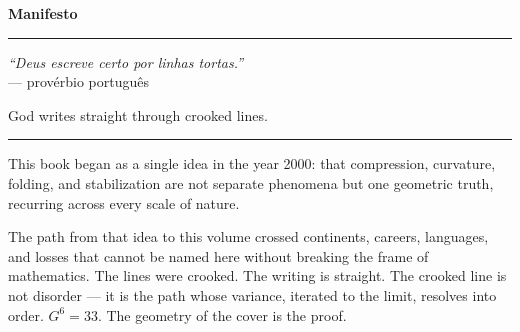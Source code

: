 \documentclass[12pt, oneside]{book}
\theoremstyle{plain}
\theoremstyle{definition}
\theoremstyle{remark}
\begin{document}
\cleardoublepage

\newpage
\thispagestyle{empty}
\vspace*{1.8cm}

\begin{center}
{\large\textbf{Manifesto}}
\end{center}

\vspace{0.5cm}

\begin{center}
\rule{0.5\textwidth}{0.4pt}
\end{center}

\vspace{0.5cm}

\begin{center}
{\large\textit{``Deus escreve certo por linhas tortas.''}}\\[0.4em]
{\small --- provérbio português}
\end{center}

\vspace{0.3cm}

\begin{center}
{\normalsize God writes straight through crooked lines.}
\end{center}

\vspace{0.5cm}

\begin{center}
\rule{0.4\textwidth}{0.2pt}
\end{center}

\vspace{0.5cm}

\noindent This book began as a single idea in the year 2000: that compression,
curvature, folding, and stabilization are not separate phenomena
but one geometric truth, recurring across every scale of nature.

\vspace{0.3cm}

\noindent The path from that idea to this volume crossed continents, careers,
languages, and losses that cannot be named here without breaking
the frame of mathematics. The lines were crooked. The writing is straight.
The crooked line is not disorder --- it is the path whose variance,
iterated to the limit, resolves into order.
$G^6 = 33$. The geometry of the cover is the proof.
\end{document}
